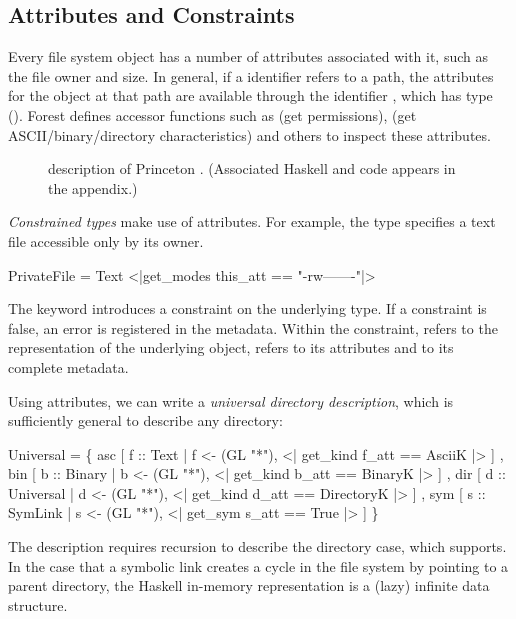 \subsection{Attributes and Constraints}
\label{sec:constraints}

Every file system object has a number of attributes associated with
it, such as the file owner and size.  In general,
if a \forest{} identifier  refers to a path, the attributes for the object at that
path are available through the identifier , which has
type  ().  Forest defines
accessor functions such as  (get permissions),  (get
ASCII/binary/directory characteristics) and others to inspect
these attributes.


\begin{figure}

\caption{\forest{} description of Princeton \filestore{}. (Associated Haskell and \pads{} code
  appears in\ifanon\auxmaterials\else{} the appendix\fi.)}
\label{fig:student-description}
\end{figure}


\textit{Constrained types} make use of attributes. For example, the
type  specifies a text file accessible only by its owner.
\begin{code}
 PrivateFile = 
 Text  <|get_modes this_att == "-rw-------"|>
\end{code}
The keyword  introduces a constraint on the underlying type.
If a constraint is false, an error 
is registered in the metadata.  Within the constraint,  refers to the representation 
of the underlying object,  refers to its attributes and  
to its complete metadata.

Using attributes, we can write a \textit{universal
  directory description}, which is sufficiently general to describe
any directory:
\begin{code}
 Universal = 
  \{ asc  [ f :: Text 
           | f <-  (GL "*"), 
          <| get_kind f_att == AsciiK |> ]
  , bin  [ b :: Binary 
           | b <-  (GL "*"), 
          <| get_kind b_att == BinaryK |> ]
  , dir  [ d :: Universal  
           | d <-  (GL "*"),
          <| get_kind d_att == DirectoryK |> ]
  , sym  [ s :: SymLink 
           | s <-  (GL "*"), 
          <| get_sym s_att == True |> ] \}
\end{code}
The description requires recursion to describe the directory case,
which \forest{} supports.
In the case that a symbolic link creates a cycle in the file system by
pointing to a parent directory, the Haskell in-memory representation
is a (lazy) infinite data structure.  

